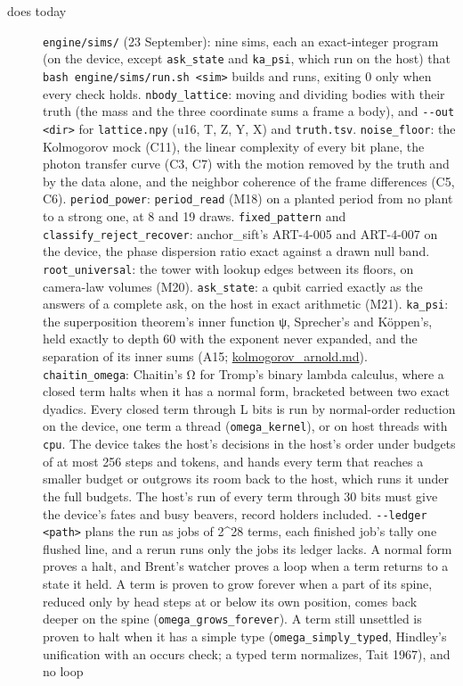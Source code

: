 \begin{description}
\item[{does today}] \texttt{engine/\allowbreak{}sims/\allowbreak{}} (23 September): nine sims, each an exact-integer program (on the device, except \texttt{ask\_\allowbreak{}state} and \texttt{ka\_\allowbreak{}psi}, which run on the host) that \texttt{bash engine/\allowbreak{}sims/\allowbreak{}run.\allowbreak{}sh <sim>} builds and runs, exiting 0 only when every check holds. \texttt{nbody\_\allowbreak{}lattice}: moving and dividing bodies with their truth (the mass and the three coordinate sums a frame a body), and \texttt{-\allowbreak{}-\allowbreak{}out <dir>} for \texttt{lattice.\allowbreak{}npy} (u16, T, Z, Y, X) and \texttt{truth.\allowbreak{}tsv}. \texttt{noise\_\allowbreak{}floor}: the Kolmogorov mock (C11), the linear complexity of every bit plane, the photon transfer curve (C3, C7) with the motion removed by the truth and by the data alone, and the neighbor coherence of the frame differences (C5, C6). \texttt{period\_\allowbreak{}power}: \texttt{period\_\allowbreak{}read} (M18) on a planted period from no plant to a strong one, at 8 and 19 draws. \texttt{fixed\_\allowbreak{}pattern} and \texttt{classify\_\allowbreak{}reject\_\allowbreak{}recover}: anchor\_\allowbreak{}sift's ART-4-005 and ART-4-007 on the device, the phase dispersion ratio exact against a drawn null band. \texttt{root\_\allowbreak{}universal}: the tower with lookup edges between its floors, on camera-law volumes (M20). \texttt{ask\_\allowbreak{}state}: a qubit carried exactly as the answers of a complete ask, on the host in exact arithmetic (M21). \texttt{ka\_\allowbreak{}psi}: the superposition theorem's inner function ψ, Sprecher's and Köppen's, held exactly to depth 60 with the exponent never expanded, and the separation of its inner sums (A15; \hyperref[chap:kolmogorov-arnold]{kolmogorov\_\allowbreak{}arnold.md}). \texttt{chaitin\_\allowbreak{}omega}: Chaitin's Ω for Tromp's binary lambda calculus, where a closed term halts when it has a normal form, bracketed between two exact dyadics. Every closed term through L bits is run by normal-order reduction on the device, one term a thread (\texttt{omega\_\allowbreak{}kernel}), or on host threads with \texttt{cpu}. The device takes the host's decisions in the host's order under budgets of at most 256 steps and tokens, and hands every term that reaches a smaller budget or outgrows its room back to the host, which runs it under the full budgets. The host's run of every term through 30 bits must give the device's fates and busy beavers, record holders included. \texttt{-\allowbreak{}-\allowbreak{}ledger <path>} plans the run as jobs of 2\textasciicircum{}28 terms, each finished job's tally one flushed line, and a rerun runs only the jobs its ledger lacks. A normal form proves a halt, and Brent's watcher proves a loop when a term returns to a state it held. A term is proven to grow forever when a part of its spine, reduced only by head steps at or below its own position, comes back deeper on the spine (\texttt{omega\_\allowbreak{}grows\_\allowbreak{}forever}). A term still unsettled is proven to halt when it has a simple type (\texttt{omega\_\allowbreak{}simply\_\allowbreak{}typed}, Hindley's unification with an occurs check; a typed term normalizes, Tait 1967), and no loop 
\end{description}
